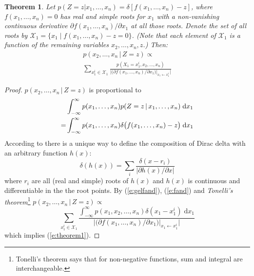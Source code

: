 \documentclass[]{article}
\newtheorem{theorem}{Theorem}
\newcommand{\pr}{p}
\newcommand{\dd}{\;\mathrm{d}} %
\begin{document}
\begin{theorem} 
\label{theorem1}
Let {\footnotesize $\pr(Z\!=\!z | x_1, \ldots, x_n) = \delta[f(x_1, \ldots, x_n)-z]$}, 
where $f(x_1, \ldots, x_n) = 0$ has real and simple roots for $x_1$ with a non-vanishing continuous derivative
$\partial f(x_1, \ldots, x_n) / \partial x_1$ at all those roots.
Denote the set of all roots by 
 $ \mathcal{X}_1 = \{ x_1 \; | \; f(x_1, \ldots, x_n) - z = 0 \} $. 
(Note that each element of $ \mathcal{X}_1 $
 is a function of the remaining variables $ x_2,\dots,x_n,z $.)
 Then:
\begin{multline}
\label{e:theorem1}
p(x_2, \ldots, x_n \,|\, Z=z) \propto \\
\sum_{x_1^i \in \mathcal{X}_1} 
\frac{p(X_1=x_1^i, x_2, \ldots, x_n)}
{\Big|\big(\partial f(x_1, \ldots, x_n) / \partial x_1 \big)|_{x_1 \leftarrow x_1^i} \Big|}
\end{multline}
\end{theorem}
\begin{proof}
$p(x_2, \ldots, x_n \,|\, Z=z)$ is proportional to
\begin{align}
%
%
%
&\int_{-\infty}^{\infty}p(x_1, \ldots, x_n)p(Z=z \,|\, x_1, \ldots, x_n) \dd x_1 \notag\\
%
=&\int_{-\infty}^{\infty}p(x_1, \ldots, x_n)
\delta \big( f(x_1, \ldots, x_n) - z \big) \dd x_1 
\label{e:fand}
\end{align}
According to \citep{gel1964generalized}
there is a unique way to define the composition of Dirac delta with 
an arbitrary function $h(x)$:
\begin{equation}
\label{e:gelfand}
\delta(h(x)) = \sum_{i} \frac{\delta(x - r_i)}{|\partial h(x)/\partial x|}
\end{equation}
where $r_i$ are all (real and simple) roots of $h(x)$ and $h(x)$ is continuous and differentiable in the the root points. By (\ref{e:gelfand}), (\ref{e:fand}) and 
\emph{Tonelli's theorem}\footnote{Tonelli's theorem says that for non-negative functions, sum and integral are interchangeable.} 
$\pr(x_2, \ldots, x_n \,|\, Z = z) \propto$
\begin{equation*}
\sum_{x_1^i \in \mathcal{X}_1} 
\frac{\int_{-\infty}^{\infty} p(x_1, x_2, \ldots, x_n)  \delta(x_1 - x_1^i) \dd x_1}
{\Big|\big(\partial f(x_1, \ldots, x_n) / \partial x_1 \big)|_{x_1 \leftarrow x_1^i} \Big|}
\end{equation*}
which implies (\ref{e:theorem1}).
\end{proof}
%
\end{document}
